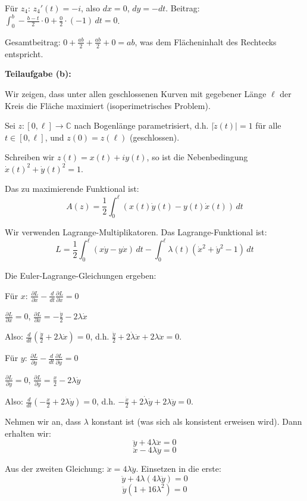 \documentclass{article}
\newcommand{\C}{\mathbb{C}}
\begin{document}
Für $z_4$: $z_4'(t) = -i$, also $dx = 0$, $dy = -dt$. Beitrag: $\int_0^b -\frac{b-t}{2} \cdot 0 + \frac{0}{2} \cdot (-1) \,dt = 0$.

Gesamtbeitrag: $0 + \frac{ab}{2} + \frac{ab}{2} + 0 = ab$, was dem Flächeninhalt des Rechtecks entspricht.

\textbf{Teilaufgabe (b):}

Wir zeigen, dass unter allen geschlossenen Kurven mit gegebener Länge $\ell$ der Kreis die Fläche maximiert (isoperimetrisches Problem).

Sei $z:[0,\ell] \to \C$ nach Bogenlänge parametrisiert, d.h. $|\dot{z}(t)| = 1$ für alle $t \in [0,\ell]$, und $z(0) = z(\ell)$ (geschlossen).

Schreiben wir $z(t) = x(t) + iy(t)$, so ist die Nebenbedingung $\dot{x}(t)^2 + \dot{y}(t)^2 = 1$.

Das zu maximierende Funktional ist:
$$A(z) = \frac{1}{2}\int_0^\ell (x(t)\dot{y}(t) - y(t)\dot{x}(t)) \,dt$$

Wir verwenden Lagrange-Multiplikatoren. Das Lagrange-Funktional ist:
$$L = \frac{1}{2}\int_0^\ell (x\dot{y} - y\dot{x}) \,dt - \int_0^\ell \lambda(t)(\dot{x}^2 + \dot{y}^2 - 1) \,dt$$

Die Euler-Lagrange-Gleichungen ergeben:

Für $x$: $\frac{\partial L}{\partial x} - \frac{d}{dt}\frac{\partial L}{\partial \dot{x}} = 0$

$\frac{\partial L}{\partial x} = 0$, $\frac{\partial L}{\partial \dot{x}} = -\frac{\dot{y}}{2} - 2\lambda\dot{x}$

Also: $\frac{d}{dt}\left(\frac{\dot{y}}{2} + 2\lambda\dot{x}\right) = 0$, d.h. $\frac{\ddot{y}}{2} + 2\dot{\lambda}\dot{x} + 2\lambda\ddot{x} = 0$.

Für $y$: $\frac{\partial L}{\partial y} - \frac{d}{dt}\frac{\partial L}{\partial \dot{y}} = 0$

$\frac{\partial L}{\partial y} = 0$, $\frac{\partial L}{\partial \dot{y}} = \frac{x}{2} - 2\lambda\dot{y}$

Also: $\frac{d}{dt}\left(-\frac{x}{2} + 2\lambda\dot{y}\right) = 0$, d.h. $-\frac{\dot{x}}{2} + 2\dot{\lambda}\dot{y} + 2\lambda\ddot{y} = 0$.

Nehmen wir an, dass $\lambda$ konstant ist (was sich als konsistent erweisen wird). Dann erhalten wir:
$$\ddot{y} + 4\lambda\ddot{x} = 0$$
$$\ddot{x} - 4\lambda\ddot{y} = 0$$

Aus der zweiten Gleichung: $\ddot{x} = 4\lambda\ddot{y}$. Einsetzen in die erste:
$$\ddot{y} + 4\lambda(4\lambda\ddot{y}) = 0$$
$$\ddot{y}(1 + 16\lambda^2) = 0$$
\end{document}
